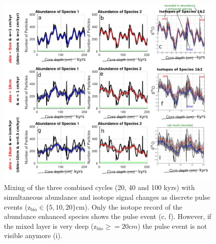 \documentclass[a4paper,oneside,9pt]{article}
\begin{document}
\begin{figure}[hbp]
\begin{center}
	\includegraphics[width=1.0\textwidth]{../figures/../figures/Allcycles_combined_pointevent_5+10+20cm_background.pdf}
	\caption{Mixing of the three combined cycles (20, 40 and 100 kyrs) with simultaneous abundance and isotope signal changes as discrete pulse events (z$_\mathrm{bio} \in \{5,10,20 \}$cm). 
	Only the isotope record of the abundance enhanced species shows the pulse event (c, f). However, if the mixed layer is very deep (z$_\mathrm{bio}\geq=20cm$) the pulse event is not visible anymore (i).}\label{fig:allcycles+pointevent}
\end{center}
\end{figure}
\begin{figure}[hbtp]
\hspace*{-0.8cm}%
\end{figure}
\end{document}
